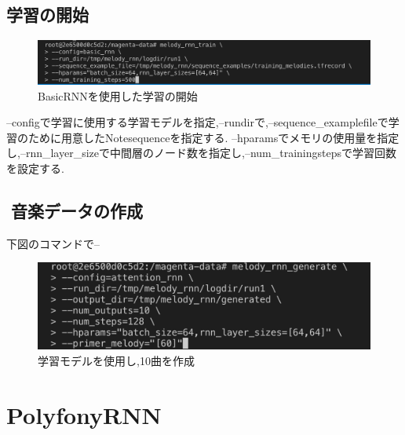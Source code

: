 \subsection{学習の開始}
\begin{figure}[!ht]
    \begin{screen}
    \begin{center}
        \includegraphics[scale=0.5, clip]{./img/Rnn_train.png}
        \caption{BasicRNNを使用した学習の開始}
        \label{fig:BasicRNNを使用した学習の開始}
    \end{center}
    \end{screen}
\end{figure}
--configで学習に使用する学習モデルを指定,--rundirで,--sequence\_examplefileで学習のために用意したNotesequenceを指定する.
--hparamsでメモリの使用量を指定し,--rnn\_layer\_sizeで中間層のノード数を指定し,--num\_trainingstepsで学習回数を設定する.\\
\subsection{音楽データの作成}
下図のコマンドで--
\begin{figure}[!ht]
    \begin{screen}
    \begin{center}
        \includegraphics[scale=0.7, clip]{./img/MIDI_make.png}
        \caption{学習モデルを使用し,10曲を作成}
        \label{fig:学習モデルを使用し,10曲を作成}
    \end{center}
    \end{screen}
\end{figure}

\section{PolyfonyRNN}